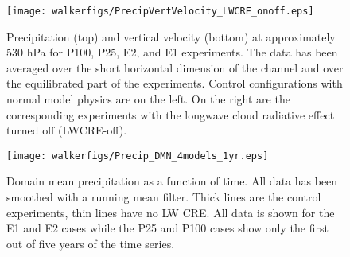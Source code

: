 \documentclass[draft]{agujournal2019}
\begin{document}



\begin{figure}
  \centering
      \texttt{[image: walkerfigs/PrecipVertVelocity\_LWCRE\_onoff.eps]}
  \caption{Precipitation (top) and vertical velocity (bottom) at approximately 530 hPa for P100, P25, E2, and E1 experiments.  
  The data has been averaged over the short horizontal dimension of the channel and over the 
  equilibrated part of the experiments.  Control configurations with normal model physics are on the 
  left.  On the right are the corresponding experiments with the longwave cloud radiative effect turned
  off (LWCRE-off).}
  \label{fig:precip_vertvel}
\end{figure}
%
%
%

\begin{figure}
  \centering
      \texttt{[image: walkerfigs/Precip\_DMN\_4models\_1yr.eps]}
  \caption{Domain mean precipitation as a function of time.  All data has been smoothed with a running mean filter.  
  Thick lines are the control experiments, thin lines have no LW CRE.  All data is shown for the E1 and E2 cases
  while the P25 and P100 cases show only the first out of five years of the time series.}
    \label{fig:precip_dom_mn}
\end{figure}
\end{document}
